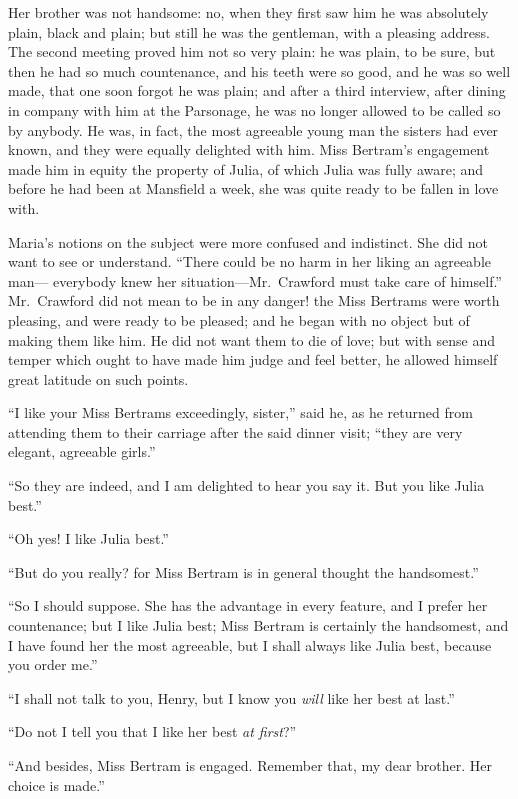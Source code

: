 Her brother was not handsome:  no, when they first saw him
he was absolutely plain, black and plain; but still he
was the gentleman, with a pleasing address.  The second
meeting proved him not so very plain:  he was plain,
to be sure, but then he had so much countenance, and his
teeth were so good, and he was so well made, that one
soon forgot he was plain; and after a third interview,
after dining in company with him at the Parsonage,
he was no longer allowed to be called so by anybody.
He was, in fact, the most agreeable young man the sisters
had ever known, and they were equally delighted with him.
Miss Bertram's engagement made him in equity the property
of Julia, of which Julia was fully aware; and before he had
been at Mansfield a week, she was quite ready to be fallen
in love with.

Maria's notions on the subject were more confused
and indistinct.  She did not want to see or understand.
``There could be no harm in her liking an agreeable man---%
everybody knew her situation---Mr.\ Crawford must take care
of himself.''  Mr.\ Crawford did not mean to be in any danger!
the Miss Bertrams were worth pleasing, and were ready
to be pleased; and he began with no object but of making
them like him.  He did not want them to die of love;
but with sense and temper which ought to have made him
judge and feel better, he allowed himself great latitude
on such points.

``I like your Miss Bertrams exceedingly, sister,'' said he,
as he returned from attending them to their carriage
after the said dinner visit; ``they are very elegant,
agreeable girls.''

``So they are indeed, and I am delighted to hear you say it.
But you like Julia best.''

``Oh yes!  I like Julia best.''

``But do you really? for Miss Bertram is in general thought
the handsomest.''

``So I should suppose.  She has the advantage in every feature,
and I prefer her countenance; but I like Julia best;
Miss Bertram is certainly the handsomest, and I have found
her the most agreeable, but I shall always like Julia best,
because you order me.''

``I shall not talk to you, Henry, but I know you \emph{will}
like her best at last.''

``Do not I tell you that I like her best \emph{at first}?''

``And besides, Miss Bertram is engaged.  Remember that,
my dear brother.  Her choice is made.''

